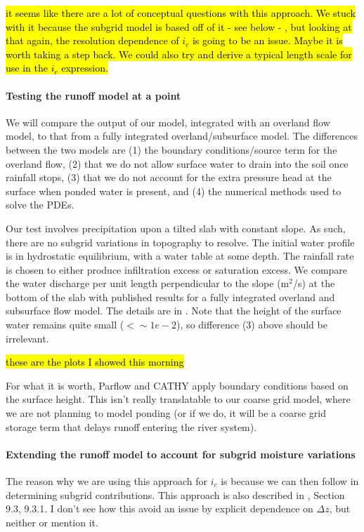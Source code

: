 \documentclass[twoside,10pt]{report}
\begin{document}
\hl{it seems like there are a lot of conceptual questions with this approach. We stuck with it because the subgrid model is based off of it - see below - , but looking at that again, the resolution dependence of $i_c$ is going to be an issue. Maybe it is worth taking a step back. We could also try and derive a typical length scale for use in the $i_c$ expression. }
\paragraph{Testing the runoff model at a point} 
We will compare the output of our model, integrated with an overland flow model, to that from a  fully integrated overland/subsurface model. The differences between the two models are (1) the boundary conditions/source term for the overland flow, (2) that we do not allow surface water to drain into the soil once rainfall stops, (3) that we do not account for the extra pressure head at the surface when ponded water is present, and (4) the numerical methods used to solve the PDEs.

Our test involves precipitation upon a tilted slab with constant slope. As such, there are no subgrid variations in topography to resolve. The initial water profile is in hydrostatic equilibrium, with a water table at some depth. The rainfall rate is chosen to either produce infiltration excess or saturation excess. We compare the water discharge per unit length perpendicular to the slope (m$^2$/s) at the bottom of the slab with published results for a fully integrated overland and subsurface flow model. The details are in \citet{Maxwell14a}. Note that the height of the surface water remains quite small ($<\sim 1e-2$), so difference (3) above should be irrelevant. 

\hl{these are the plots I showed this morning}

For what it is worth, Parflow and CATHY apply boundary conditions based on the surface height. This isn't really translatable to our coarse grid model, where we are not planning to model ponding (or if we do, it will be a coarse grid storage term that delays runoff entering the river system). 
\paragraph{Extending the runoff model to account for subgrid moisture variations}
The reason why we are using this approach for $i_c$ is because we can then follow \citep{Entekhabi89} in determining subgrid contributions. This approach is also described in \citet{Bonan19a}, Section 9.3, 9.3.1. I don't see how this avoid an issue by explicit dependence on $\Delta z$, but neither \citet{Entekhabi89} or \citet{Bonan19a} mention it. 
\end{document}
